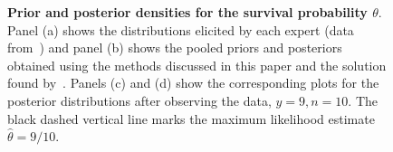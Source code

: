 \documentclass[a4paper, notitlepage, 11pt]{article}
\begin{document}
\begin{figure}[!ht]
\begin{center}
\end{center}
\caption{\textbf{Prior and posterior densities for the survival probability $\theta$}.
Panel (a) shows the distributions elicited by each expert (data from~\cite{Savchuk1994}) and panel (b) shows the pooled priors and posteriors obtained using the methods discussed in this paper and the solution found by~\cite{Rufo2012B}.
Panels (c) and (d) show the corresponding plots for the posterior distributions after observing the data, $y = 9, n = 10$.
The black dashed vertical line marks the maximum likelihood estimate $\hat{\theta}= 9/10$.
}
\label{fig:priors_pooled_Savchuk}
\end{figure}
\end{document}

